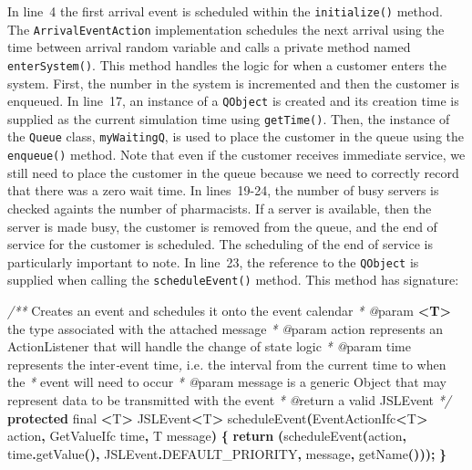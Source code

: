 \documentclass[
]{book}
\newenvironment{Shaded}{\begin{snugshade}}{\end{snugshade}}
\newcommand{\CommentTok}[1]{\textcolor[rgb]{0.56,0.35,0.01}{\textit{#1}}}
\newcommand{\ControlFlowTok}[1]{\textcolor[rgb]{0.13,0.29,0.53}{\textbf{#1}}}
\newcommand{\DataTypeTok}[1]{\textcolor[rgb]{0.13,0.29,0.53}{#1}}
\newcommand{\FunctionTok}[1]{\textcolor[rgb]{0.00,0.00,0.00}{#1}}
\newcommand{\KeywordTok}[1]{\textcolor[rgb]{0.13,0.29,0.53}{\textbf{#1}}}
\newcommand{\NormalTok}[1]{#1}
\newcommand{\OperatorTok}[1]{\textcolor[rgb]{0.81,0.36,0.00}{\textbf{#1}}}
\theoremstyle{definition}
\theoremstyle{definition}
\theoremstyle{definition}
\theoremstyle{definition}
\theoremstyle{remark}
\begin{document}
In line~4 the first arrival event is scheduled
within the \texttt{initialize()} method. The \texttt{ArrivalEventAction} implementation
schedules the next arrival using the time between arrival random
variable and calls a private method named \texttt{enterSystem()}. This method
handles the logic for when a customer enters the system. First, the
number in the system is incremented and then the customer is enqueued.
In line~17, an instance of a \texttt{QObject} is created and its creation time is
supplied as the current simulation time using \texttt{getTime()}. Then, the
instance of the \texttt{Queue} class, \texttt{myWaitingQ}, is used to place the customer
in the queue using the \texttt{enqueue()} method. Note that even if the customer
receives immediate service, we still need to place the customer in the
queue because we need to correctly record that there was a zero wait
time. In lines~19-24, the number of busy servers is checked againts the
number of pharmacists. If a server is available, then the server is made
busy, the customer is removed from the queue, and the end of service for
the customer is scheduled. The scheduling of the end of service is
particularly important to note. In line~23, the reference to the \texttt{QObject}
is supplied when calling the \texttt{scheduleEvent()} method. This method has
signature:

\begin{Shaded}
\begin{Highlighting}[]
    \CommentTok{/**}\NormalTok{ Creates an event and schedules it onto the event calendar}
\CommentTok{     * @}\NormalTok{param }\KeywordTok{\textless{}T\textgreater{}}\NormalTok{ the type associated with the attached message}
     \CommentTok{*} \CommentTok{@}\NormalTok{param action represents an ActionListener that will handle the change of state logic}
     \CommentTok{*} \CommentTok{@}\NormalTok{param time represents the inter}\CommentTok{{-}}\NormalTok{event time}\CommentTok{,}\NormalTok{ i}\CommentTok{.}\NormalTok{e}\CommentTok{.}\NormalTok{ the interval from the current time to when the}
     \CommentTok{*}\NormalTok{        event will need to occur}
     \CommentTok{*} \CommentTok{@}\NormalTok{param message is a generic Object that may represent data to be transmitted with the event}
     \CommentTok{*} \CommentTok{@}\NormalTok{return a valid JSLEvent}
     \CommentTok{*/}
    \KeywordTok{protected} \DataTypeTok{final} \OperatorTok{\textless{}}\NormalTok{T}\OperatorTok{\textgreater{}}\NormalTok{ JSLEvent}\OperatorTok{\textless{}}\NormalTok{T}\OperatorTok{\textgreater{}} \FunctionTok{scheduleEvent}\OperatorTok{(}\NormalTok{EventActionIfc}\OperatorTok{\textless{}}\NormalTok{T}\OperatorTok{\textgreater{}}\NormalTok{ action}\OperatorTok{,}\NormalTok{ GetValueIfc time}\OperatorTok{,}\NormalTok{ T message}\OperatorTok{)} \OperatorTok{\{}
        \ControlFlowTok{return} \OperatorTok{(}\FunctionTok{scheduleEvent}\OperatorTok{(}\NormalTok{action}\OperatorTok{,}\NormalTok{ time}\OperatorTok{.}\FunctionTok{getValue}\OperatorTok{(),}\NormalTok{ JSLEvent}\OperatorTok{.}\FunctionTok{DEFAULT\_PRIORITY}\OperatorTok{,}\NormalTok{ message}\OperatorTok{,} \FunctionTok{getName}\OperatorTok{()));}
    \OperatorTok{\}}
\end{Highlighting}
\end{Shaded}
\end{document}
